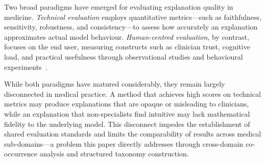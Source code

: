 Two broad paradigms have emerged for evaluating explanation quality in
medicine. \emph{Technical evaluation} employs quantitative metrics---such as
faithfulness, sensitivity, robustness, and consistency---to assess how
accurately an explanation approximates actual model behaviour.
\emph{Human-centred evaluation}, by contrast, focuses on the end user,
measuring constructs such as clinician trust, cognitive load, and practical
usefulness through observational studies and behavioural
experiments~\cite{lenis2020domain}.

While both paradigms have matured considerably, they remain largely
disconnected in medical practice. A method that achieves high scores on
technical metrics may produce explanations that are opaque or misleading to
clinicians, while an explanation that non-specialists find intuitive may
lack mathematical fidelity to the underlying model. This disconnect
impedes the establishment of shared evaluation standards and limits the
comparability of results across medical sub-domains---a problem this
paper directly addresses through cross-domain co-occurrence analysis
and structured taxonomy construction.

